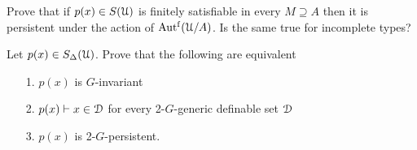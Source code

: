 



\begin{exercise}
  Prove that if $p(x)\in S(\EuScript U)$ is finitely satisfiable in every $M\supseteq A$ then it is persistent under the action of $\mbox{Aut$^{\rm f}$}(\EuScript U/A)$.
  Is the same true for incomplete types?
\end{exercise}

\begin{exercise}
  Let $p(x)\in S_\Delta(\EuScript U)$.
  Prove that the following are equivalent
  \begin{itemize}
    \item[1.] $p(x)$ is $G$-invariant
    \item[2.] $p(x)\vdash x\in\EuScript D$ for every 2-$G$-generic definable set $\EuScript D$
    \item[3.] $p(x)$ is 2-$G$-persistent.
  \end{itemize}
\end{exercise}

